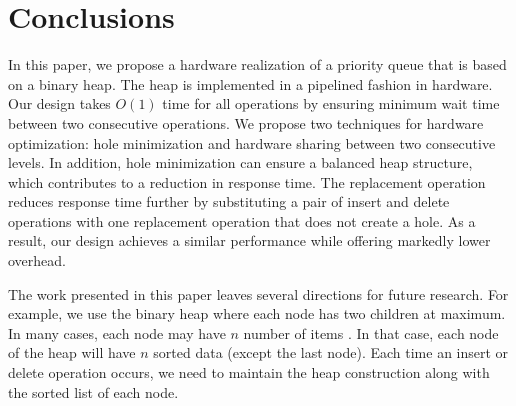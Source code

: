 \section{Conclusions}

In this paper, we propose a hardware realization of a priority queue that is based on a binary heap.
The heap is implemented in a pipelined fashion in hardware.
Our design takes $O(1)$ time for all operations by ensuring minimum wait time between two consecutive operations.
We propose two techniques for hardware optimization: hole minimization and hardware sharing between two consecutive levels.
In addition, hole minimization can ensure a balanced heap structure, which contributes to a reduction in response time.
The replacement operation reduces response time further by substituting a pair of insert and delete operations with one replacement operation that does not create a hole.
As a result, our design achieves a similar performance while offering markedly lower overhead.

The work presented in this paper leaves several directions for future research. For example, we use the binary heap where each node has two children at maximum. In many cases, each node may have $n$ number of items \cite{pq3}. In that case, each node of the heap will have $n$ sorted data (except the last node). Each time an insert or delete operation occurs, we need to maintain the heap construction along with the sorted list of each node.

\begin{comment}
The work presented in this paper leaves several directions for the future research. We presented some of these ideas here.
 \begin{itemize}
 \item We used the binary heap where each node has maximum two children. In general, each node may have $n$ number of items \cite{pq3}.
In that case, each node of the heap will have $n$ sorted data (except the last node).
For each time of {\it insert} or {\it delete}, we need to assure heap construction along with the sorted list of each node.
There could be abundant parallelism in operations, but the implementation may incur large overhead.
 \item On-chip memory is limited (32 MB in our case, which means $2^{25}$ nodes can be simulated). To make the design more scalable, we can configure this into FPGA-ARM-core where FPGA is integrated into ARM processor. External RAM can be used, keeping in mind that this would lead slow design for extra memory access time.
 \end{itemize}
\end{comment}
